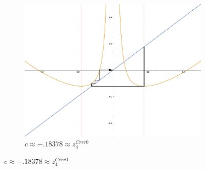 \begin{figure}[ht]
\begin{subfigure}[b]{0.3\textwidth}
				\includegraphics[width=\textwidth]{./img/plot-018378}
				\caption{$c \approx -.18378 \approx z_4^{Crrr0}$}
		\end{subfigure}


\end{figure}
